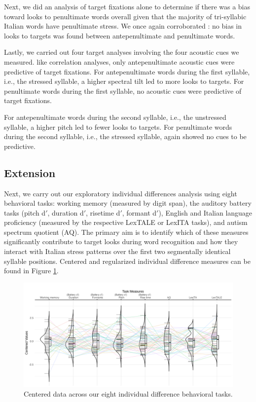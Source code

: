 Next, we did an analysis of target fixations alone to determine if there was a bias toward looks to penultimate words overall given that the majority of tri-syllabic Italian words have penultimate stress. We once again corroborated \cite{Sulpizio_McQueen_2012}: no bias in looks to targets was found between antepenultimate and penultimate words.

Lastly, we carried out four target analyses involving the four acoustic cues we measured. like \cite{Sulpizio_McQueen_2012} correlation analyses, only antepenultimate acoustic cues were predictive of target fixations. For antepenultimate words during the first syllable, i.e., the stressed syllable, a higher spectral tilt led to more looks to targets. For penultimate words during the first syllable, no acoustic cues were predictive of target fixations.

For antepenultimate words during the second syllable, i.e., the unstressed syllable, a higher pitch led to fewer looks to targets. For penultimate words during the second syllable, i.e., the stressed syllable, again showed no cues to be predictive. 

\subsection{Extension}

Next, we carry out our exploratory individual differences analysis \citep{Yanai2020} using eight behavioral tasks: working memory (measured by digit span), the auditory battery tasks (pitch d$'$, duration d$'$, risetime d$'$, formant d$'$), English and Italian language proficiency (measured by the respective LexTALE or LexITA tasks), and autism spectrum quotient (AQ). The primary aim is to identify which of these measures significantly contribute to target looks during word recognition and how they interact with Italian stress patterns over the first two segmentally identical syllable positions. Centered and regularized individual difference measures can be found in Figure \ref{fig:plot_raw_task}.

\begin{figure}[H]
  \centering
  \includegraphics[width=1\linewidth]{visuals/plot_raw_task.jpeg}
  \caption{Centered data across our eight individual difference behavioral tasks.}
  \label{fig:plot_raw_task}
\end{figure}


